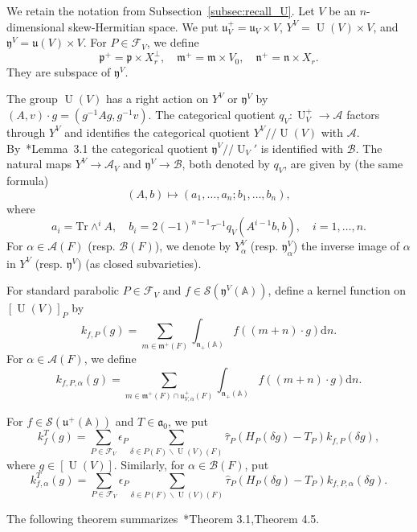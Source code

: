 \documentclass[letterpaper,11pt]{amsart}
\newcommand{\fa}{\mathfrak{a}}
\newcommand{\fm}{\mathfrak{m}}
\newcommand{\fn}{\mathfrak{n}}
\newcommand{\fp}{\mathfrak{p}}
\newcommand{\fu}{\mathfrak{u}}
\newcommand{\fy}{\mathfrak{y}}
\newcommand{\bA}{\mathbb{A}}
\newcommand{\cA}{\mathcal{A}}
\newcommand{\cB}{\mathcal{B}}
\newcommand{\cF}{\mathcal{F}}
\newcommand{\cS}{\mathcal{S}}
\newcommand{\rd}{\mathrm{d}}
\newcommand{\<}{\negthickspace}
\DeclareMathOperator{\U}{U}
\theoremstyle{definition}
\theoremstyle{plain}
\theoremstyle{remark}
\numberwithin{equation}{section}
\begin{document}
We retain the notation from Subsection~\ref{subsec:recall_U}.
Let $V$ be an $n$-dimensional skew-Hermitian space. We put $\fu_V^+ = \fu_V \times V$, $Y^V =
\U(V) \times V$, and $\fy^V = \fu(V) \times V$. For $P \in \cF_V$, we define 
    \[
    \fp^+ = \fp \times X_r^{\perp}, \quad \fm^+ = \fm \times V_0, \quad 
    \fn^+ = \fn \times X_r.
    \]
They are subspace of $\fy^V$.

The group $\U(V)$ has a right action on $Y^V$ or $\fy^V$ by $(A, v) \cdot
g=(g^{-1}Ag, g^{-1} v)$. The categorical quotient $q_V: \U_V^+ \to \cA$ factors through $Y^V$ and identifies the categorical quotient $Y^V//\U(V)$ with $\cA$. By~\cite{Zhang1}*{Lemma~3.1} the categorical quotient $\fy^V//\U_V'$ is identified with $\cB$.
The natural maps $Y^V \to \cA_V$ and $\fy^V \to \cB$, both denoted by $q_V$,
are given by (the same formula)
    \[
    (A, b) \mapsto (a_1, \hdots, a_n; b_1, \hdots, b_n),
    \]
where
    \[
    a_i = \mathrm{Tr} \wedge^i A, \quad
    b_i = 2 (-1)^{n-1} \tau^{-1} q_V( A^{i-1} b, b), \quad i = 1, \hdots, n.
    \]
For $\alpha \in \cA(F)$ (resp. $\cB(F)$), we denote by $Y^V_{\alpha}$ (resp.
$\fy^V_{\alpha}$) the inverse image of $\alpha$ in $Y^V$ (resp. $\fy^V$) (as
closed subvarieties). 

For standard parabolic $P \in \cF_V$ and $f \in \cS(\fy^V(\bA))$, define a
kernel function on $[\U(V)]_P$ by
    \[
    k_{f,P}(g)=
    \sum_{m \in \fm^+(F)} \int_{\fn_+(\bA)} f((m+n) \cdot g) \rd n.
    \]
For $\alpha \in \cA(F)$, we define
    \[
    k_{f,P,\alpha}(g)
    =\sum_{m \in \fm^+(F) \cap \fu^+_{V, \alpha}(F)} \int_{\fn_+(\bA)}
    f((m+n)\cdot g) \rd n.
    \]

For $f \in
\cS(\fu^+(\bA))$ and $T \in \fa_0$, we put
    \[
    k_{f}^T(g) = \sum_{P \in \cF_V} \epsilon_P
    \sum_{\delta \in P(F) \backslash \U(V)(F)}
    \widehat{\tau}_P(H_P(\delta g)-T_P) k_{f,P}(\delta g),
    \]
where $g \in [\U(V)]$. Similarly, for $\alpha \in \cB(F)$, put
    \[
    k_{f,\alpha}^T(g) =
    \sum_{P \in \cF_V} \epsilon_P \sum_{\delta \in P(F) \backslash \U(V)(F)}
    \widehat{\tau}_P(H_P(\delta g)-T_P)
    k_{f,P,\alpha}(\delta g).
    \]

The following theorem summarizes~\cite{Zydor2}*{Theorem 3.1,Theorem 4.5}.
\end{document}
